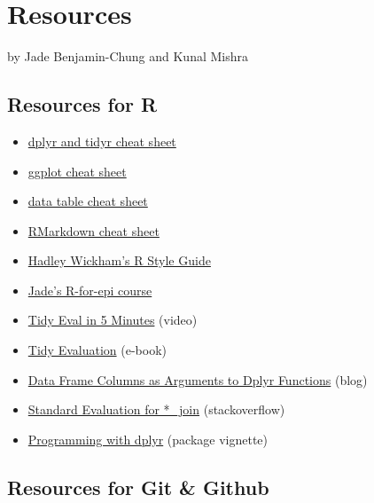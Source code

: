 \documentclass[
]{book}
\providecommand{\tightlist}{%
  \setlength{\itemsep}{0pt}\setlength{\parskip}{0pt}}
\begin{document}
\hypertarget{resources}{%
\chapter{Resources}\label{resources}}

by Jade Benjamin-Chung and Kunal Mishra

\hypertarget{resources-for-r}{%
\section{Resources for R}\label{resources-for-r}}

\begin{itemize}
\tightlist
\item
  \href{https://www.rstudio.com/wp-content/uploads/2015/02/data-wrangling-cheatsheet.pdf}{dplyr and tidyr cheat sheet}
\item
  \href{https://www.rstudio.com/wp-content/uploads/2015/03/ggplot2-cheatsheet.pdf}{ggplot cheat sheet}
\item
  \href{https://s3.amazonaws.com/assets.datacamp.com/blog_assets/datatable_Cheat_Sheet_R.pdf}{data table cheat sheet}
\item
  \href{https://www.rstudio.com/wp-content/uploads/2015/02/rmarkdown-cheatsheet.pdf}{RMarkdown cheat sheet}
\item
  \href{http://adv-r.had.co.nz/Style.html}{Hadley Wickham's R Style Guide}
\item
  \href{https://ucb-epi-r.github.io}{Jade's R-for-epi course}
\item
  \href{https://www.youtube.com/watch?v=nERXS3ssntw}{Tidy Eval in 5 Minutes} (video)
\item
  \href{https://tidyeval.tidyverse.org/index.html}{Tidy Evaluation} (e-book)
\item
  \href{https://www.brodrigues.co/blog/2016-07-18-data-frame-columns-as-arguments-to-dplyr-functions/}{Data Frame Columns as Arguments to Dplyr Functions} (blog)
\item
  \href{https://stackoverflow.com/questions/28125816/r-standard-evaluation-for-join-dplyr}{Standard Evaluation for *\_join} (stackoverflow)
\item
  \href{https://dplyr.tidyverse.org/articles/programming.html}{Programming with dplyr} (package vignette)
\end{itemize}

\hypertarget{resources-for-git-github}{%
\section{Resources for Git \& Github}\label{resources-for-git-github}}
\end{document}
